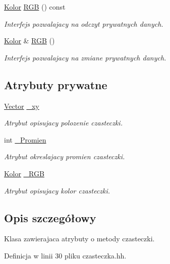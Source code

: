 \begin{DoxyCompactItemize}
\hyperlink{class_kolor}{Kolor} \hyperlink{class_czasteczka_a546104013fe302440214f8809d7ec602}{R\+G\+B} () const 
\begin{DoxyCompactList}\small\item\em Interfejs pozwalajacy na odczyt prywatnych danych. \end{DoxyCompactList}\item 
\hyperlink{class_kolor}{Kolor} \& \hyperlink{class_czasteczka_aa70b19b0f59c5e4b244a9ff203d6de41}{R\+G\+B} ()
\begin{DoxyCompactList}\small\item\em Interfejs pozwalajacy na zmiane prywatnych danych. \end{DoxyCompactList}\end{DoxyCompactItemize}
\subsection*{Atrybuty prywatne}
\begin{DoxyCompactItemize}
\item 
\hyperlink{class_vector}{Vector} \hyperlink{class_czasteczka_a025a3ee895f8ee9c765814cfca1fd5e1}{\+\_\+xy}
\begin{DoxyCompactList}\small\item\em Atrybut opisujacy polozenie czasteczki. \end{DoxyCompactList}\item 
int \hyperlink{class_czasteczka_a5a1d126d89bd571c79a5691c45e2f469}{\+\_\+\+Promien}
\begin{DoxyCompactList}\small\item\em Atrybut okreslajacy promien czasteczki. \end{DoxyCompactList}\item 
\hyperlink{class_kolor}{Kolor} \hyperlink{class_czasteczka_ab9c93cfb3cf0360579ad0def2a94178c}{\+\_\+\+R\+G\+B}
\begin{DoxyCompactList}\small\item\em Atrybut opisujacy kolor czasteczki. \end{DoxyCompactList}\end{DoxyCompactItemize}


\subsection{Opis szczegółowy}
Klasa zawierajaca atrybuty o metody czasteczki. 

Definicja w linii 30 pliku czasteczka.\+hh.



